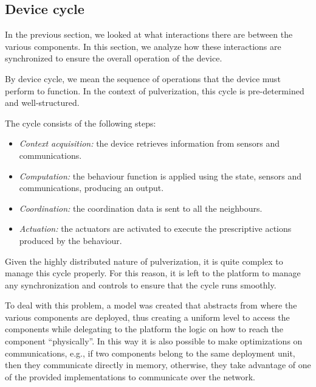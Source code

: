 \subsection{Device cycle}
\label{sec:framework-device-cycle}

In the previous section, we looked at what interactions there are between the various components. In this section, we analyze how these interactions
are synchronized to ensure the overall operation of the device.

By device cycle, we mean the sequence of operations that the device must perform to function. In the context of pulverization, this cycle is
pre-determined and well-structured.

The cycle consists of the following steps:

\begin{itemize}
	\item \textit{Context acquisition:} the device retrieves information from sensors and communications.
	\item \textit{Computation:} the behaviour function is applied using the state, sensors and communications, producing an output.
	\item \textit{Coordination:} the coordination data is sent to all the neighbours.
	\item \textit{Actuation:} the actuators are activated to execute the prescriptive actions produced by the behaviour.
\end{itemize}

Given the highly distributed nature of pulverization, it is quite complex to manage this cycle properly. For this reason, it is left to the platform
to manage any synchronization and controls to ensure that the cycle runs smoothly.

To deal with this problem, a model was created that abstracts from where the various components are deployed, thus creating a uniform level
to access the components while delegating to the platform the logic on how to reach the component ``physically''. In this way it is also possible
to make optimizations on communications, e.g., if two components belong to the same deployment unit, then they communicate directly in memory,
otherwise, they take advantage of one of the provided implementations to communicate over the network.



